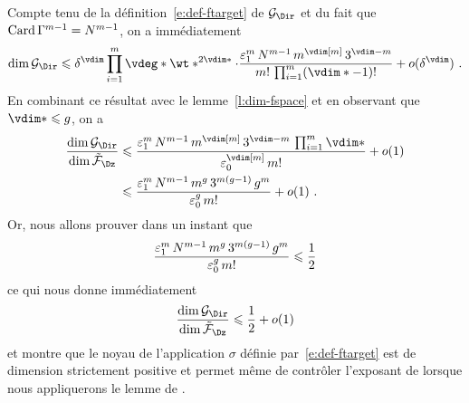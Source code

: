 Compte tenu de la définition~\eqref{e:def-ftarget} de \( \ftarget \) et du
fait que \( \operatorname{Card} \Gamma^{m-1} = N^{m-1} \), on a
immédiatement
\begin{equation}
  \dim \ftarget
  \le
  \delta^\vdim
  \prod\fctrange \vdeg* \wt*^{2\vdim*}
  \cdot
  \frac {
    \epsi^\puiss
    \, \nclmaps^{\puiss-1}
    \, \puiss^{\vdim[\puiss]}
    \, 3^{\vdim - \puiss}
  }{
    \puiss!
    \, \prod\fctrange (\vdim* - 1)!
  }
  + o(\delta^\vdim)
  \pmm.
\end{equation}
En combinant ce résultat avec le lemme~\vref{l:dim-fspace} et en observant que
\( \vdim* \le \genre \), on a
\begin{align}
  \frac {\dim \ftarget} {\dim \fspace}
  & \le
  \frac {
    \epsi^\puiss
    \, \nclmaps^{\puiss-1}
    \, \puiss^{\vdim[\puiss]}
    \, 3^{\vdim - \puiss}
    \, \prod\fctrange \vdim*
  }{
    \epsz^{\vdim[\puiss]}
    \, \puiss!
  }
  + o(1)
  \\ & \le
  \frac {
    \epsi^\puiss
    \, \nclmaps^{\puiss-1}
    \, \puiss ^{\genre}
    \, 3 ^{\puiss (\genre-1)}
    \, \genre^\puiss
  }{
    \epsz^\genre
    \, \puiss!
  }
  + o(1)
  \pmm.
\end{align}
Or, nous allons prouver dans un instant que
\begin{equation} \label{e:ct-eps*-siegel}
  \frac {
    \varepsilon\sb1^m
    \, N^{m-1}
    \, m ^{g}
    \, 3 ^{m (g-1)}
    \, g^m
  }{
    \varepsilon\sb0^g
    \, m!
  }
  \leqslant
  \frac12
\end{equation}
ce qui nous donne immédiatement
\begin{equation} \label{e:good-codim}
  \frac {\dim \ftarget} {\dim \fspace}
  \le
  \frac12
  + o(1)
\end{equation}
et montre que le noyau de l'application \( \sigma \) définie
par~\eqref{e:def-ftarget} est de dimension strictement positive et permet même
de contrôler l'exposant de  lorsque nous appliquerons le lemme
de \TS.

